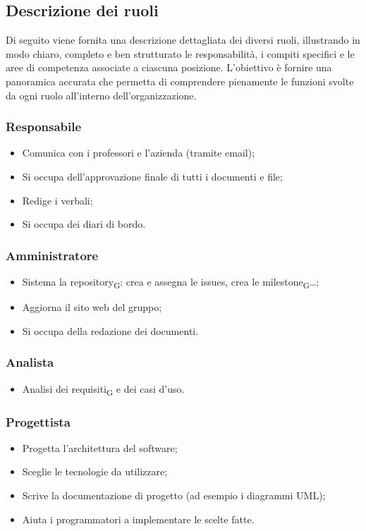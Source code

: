 \documentclass[11pt,a4paper]{article}
\newcommand{\gls}[1]{#1\textsubscript{G}}
\begin{document}
\subsection{Descrizione dei ruoli}
Di seguito viene fornita una descrizione dettagliata dei diversi ruoli, illustrando in modo chiaro, completo e ben strutturato le responsabilità, i compiti specifici e le aree di competenza associate a ciascuna posizione. L’obiettivo è fornire una panoramica accurata che permetta di comprendere pienamente le funzioni svolte da ogni ruolo all’interno dell’organizzazione.

\subsubsection{Responsabile}
\begin{itemize}
    \item Comunica con i professori e l'azienda (tramite email);
    \item Si occupa dell'approvazione finale di tutti i documenti e file;
    \item Redige i verbali;
    \item Si occupa dei diari di bordo.
\end{itemize}

\subsubsection{Amministratore}
\begin{itemize}
    \item Sistema la \gls{repository}: crea e assegna le issues, crea le \gls{milestone}…;
    \item Aggiorna il sito web del gruppo;
    \item Si occupa della redazione dei documenti.
\end{itemize}

\subsubsection{Analista}
\begin{itemize}
    \item \gls{Analisi dei requisiti} e dei casi d'uso.
\end{itemize}

\subsubsection{Progettista}
\begin{itemize}
    \item Progetta l’architettura del software;
    \item Sceglie le tecnologie da utilizzare;
    \item Scrive la documentazione di progetto (ad esempio i diagrammi UML);
    \item Aiuta i programmatori a implementare le scelte fatte.
\end{itemize}
\end{document}
